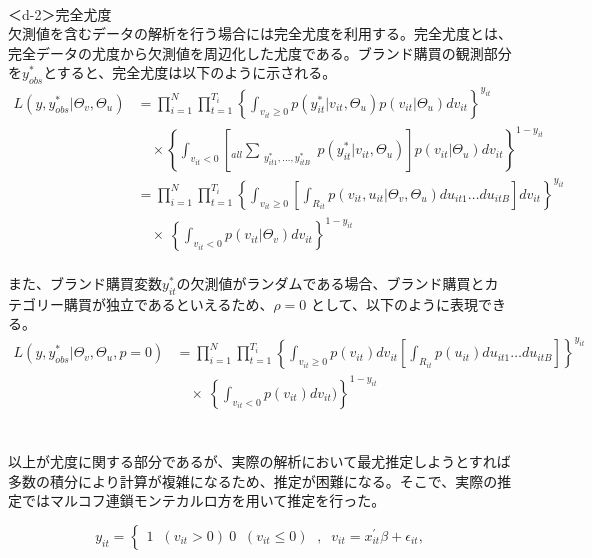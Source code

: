 \documentclass[11pt]{jsarticle}
\begin{document}
\\
＜d-2＞完全尤度\\
欠測値を含むデータの解析を行う場合には完全尤度を利用する。完全尤度とは、完全データの尤度から欠測値を周辺化した尤度である。ブランド購買の観測部分を$y_{obs}^{*}$とすると、完全尤度は以下のように示される。\\
\begin{equation} \label{formulad2_1}
\begin{split}
L(y, y^\ast_{obs} | \Theta_{v}, \Theta_{u}) &=
\prod_{i=1}^{N} \prod_{t=1}^{T_{i}}
\left\{
\int_{v_{it} \geq 0} p(y^\ast_{it} | v_{it}, \Theta_{u}) p(v_{it} | \Theta_{u}) dv_{it}
\right\}^{y_{it}} \\
&\quad \times \left\{
\int_{v_{it} < 0} 
\left[_{all}
\sum_{\substack{y^\ast_{it1}, \ldots, y^\ast_{itB}}} p(y^\ast_{it} | v_{it}, \Theta_{u})
\right] p(v_{it} | \Theta_{u}) dv_{it}
\right\}^{1 - y_{it}} \\
&= \prod_{i=1}^{N} \prod_{t=1}^{T_{i}}
\left\{
\int_{v_{it} \geq 0}
\left[
\int_{R_{it}} p(v_{it}, u_{it} | \Theta_{v}, \Theta_{u}) du_{it1} \ldots du_{itB}
\right] dv_{it}
\right\}^{y_{it}} \\
& \quad \times \
\left\{
\int_{v_{it} < 0} p(v_{it} | \Theta_{v}) dv_{it}
\right\}^{1 - y_{it}}
\end{split}
\end{equation}\\
また、ブランド購買変数$y_{it}^{*}$の欠測値がランダムである場合、ブランド購買とカテゴリー購買が独立であるといえるため、$\rho = 0$ として、以下のように表現できる。\\
\begin{equation} \label{formulad2_2}
\begin{split}
L(y, y^\ast_{obs} | \Theta_{v}, \Theta_{u}, p = 0) &= \prod_{i=1}^{N} \prod_{t=1}^{T_{i}}
\left\{
\int_{v_{it} \geq 0} p(v_{it}) dv_{it}
\left[
\int_{R_{it}} p(u_{it} ) du_{it1} \ldots du_{itB}
\right]
\right\}^{y_{it}} \\
& \quad \times \
\left\{
\int_{v_{it} < 0} p(v_{it})dv_{it})
\right\}^{1 - y_{it}}
\end{split}
\end{equation}\\
\\
以上が尤度に関する部分であるが、実際の解析において最尤推定しようとすれば多数の積分により計算が複雑になるため、推定が困難になる。そこで、実際の推定ではマルコフ連鎖モンテカルロ方を用いて推定を行った。

\begin{equation} \label{formulad2_3}
y_{it} = \begin{cases}
             1 \;\; ( v_{it} > 0 )\
             0 \;\; ( v_{it} \leq 0 )\
             \end{cases}
             , \;\; v_{it} = x^{\prime}_{it} \beta + \epsilon_{it},
\end{equation}
\end{document}
